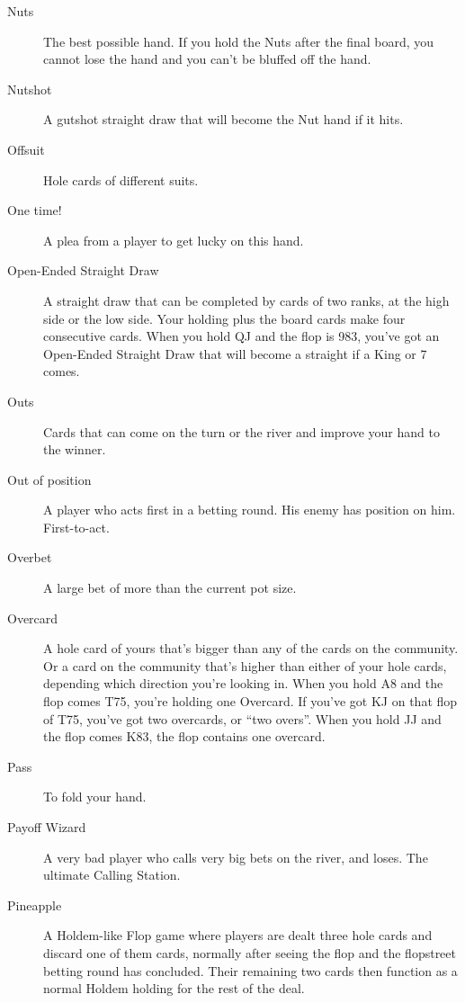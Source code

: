 \begin{description}
\item[Nuts] The best possible hand. If you hold the Nuts
after the final board, you cannot lose the hand and you can't be
bluffed off the hand.

\item[Nutshot] A gutshot straight draw that will become the Nut hand
if it hits.

\item[Offsuit] Hole cards of different suits.

\item[One time!] A plea from a player to get lucky on this hand.

\item[Open-Ended Straight Draw] A straight draw that can be completed
by cards of two ranks, at the high side or the low side. Your holding
plus the board cards make four consecutive cards. When you hold QJ
and the flop is 983, you've got an Open-Ended Straight Draw that will
become a straight if a King or 7 comes.

\item[Outs] Cards that can come on the turn or the river and improve
your hand to the winner.

\item[Out of position] A player who acts first in a betting round. His
enemy has position on him. First-to-act.

\item[Overbet] A large bet of more than the current pot size.


\item[Overcard] A hole card of yours that's bigger than any of the
cards on the community. Or a card on the community that's higher than
either of your hole cards, depending which direction you're looking
in. When you hold A8 and the flop comes T75, you're holding one
Overcard. If you've got KJ on that flop of T75, you've got two
overcards, or ``two overs''. When you hold JJ and the flop comes K83,
the flop contains one overcard.

\item[Pass] To fold your hand.

\item[Payoff Wizard] A very bad player who calls very big bets on the
river, and loses. The ultimate Calling Station.

\item[Pineapple] A Holdem-like Flop game where players are dealt three
hole cards and discard one of them cards, normally after seeing the
flop and the flopstreet betting round has concluded. Their remaining
two cards then function as a normal Holdem holding for the rest of the
deal.


\end{description}
